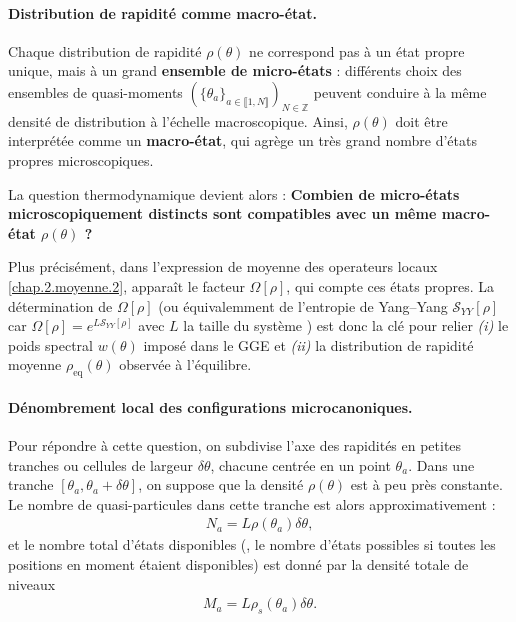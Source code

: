 
\paragraph{Distribution de rapidité comme macro-état.}

Chaque distribution de rapidité $\rho(\theta)$ ne correspond pas à un état propre unique, mais à un grand {\bf ensemble de micro-états} : différents choix des ensembles de quasi-moments $(\{\theta_a\}_{a \in \llbracket 1 , N \rrbracket })_{N \in \mathbb{Z}} $ peuvent conduire à la même densité de distribution à l’échelle macroscopique. Ainsi, $\rho(\theta)$ doit être interprétée comme un {\bf macro-état}, qui agrège un très grand nombre d’états propres microscopiques.

La question thermodynamique devient alors : {\bf Combien de micro-états microscopiquement distincts sont compatibles avec un même macro-état $\rho(\theta)$ ?} 

\medskip
Plus précisément, dans l’expression de moyenne des operateurs locaux \eqref{chap.2.moyenne.2}, apparaît le facteur
\(
\Omega[\rho]
\),
qui compte ces états propres.  
La détermination de $\Omega[\rho]$ (ou équivalemment de l’entropie de Yang–Yang $\mathcal{S}_{YY}[\rho]$ car 
\(
\Omega[\rho] = e^{L\mathcal{S}_{YY}[\rho]}
\)
avec $L$ la taille du système
) est donc la clé pour relier \emph{(i)} le poids spectral $w(\theta)$ imposé dans le GGE et \emph{(ii)} la distribution de rapidité moyenne $\rho_{\mathrm{eq}}(\theta)$ observée à l’équilibre.

\paragraph{Dénombrement local des configurations microcanoniques.}
Pour répondre à cette question, on subdivise l’axe des rapidités en petites tranches ou cellules de largeur $\delta \theta$, chacune centrée en un point $\theta_a$. Dans une tranche $[\theta_a, \theta_a + \delta\theta]$, on suppose que la densité $\rho(\theta)$ est à peu près constante. Le nombre de quasi-particules dans cette tranche est alors approximativement :
\begin{eqnarray*}
	N_a = L\rho(\theta_a) \delta \theta,
\end{eqnarray*}
et le nombre total d'états disponibles (\ie, le nombre d’états possibles si toutes les positions en moment étaient disponibles) est donné par la densité totale de niveaux 
\begin{eqnarray*}
	M_a = L\rho_s(\theta_a) \delta \theta.
\end{eqnarray*}

